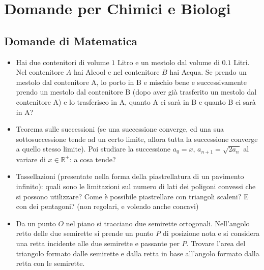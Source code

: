 \documentclass[a4paper,11pt]{article}
\newcommand{\RR}{\mathbb{R}}
\begin{document}
\begin{itemize}
\end{itemize}

\section*{Domande per Chimici e Biologi}
\subsection*{Domande di Matematica}
\begin{itemize}
\item Hai due contenitori di volume $1$ Litro e un mestolo dal volume di $0.1$ Litri. Nel contenitore $A$ hai Alcool e nel contenitore $B$ hai Acqua. Se prendo un mestolo dal contenitore A, lo porto in B e mischio bene e successivamente prendo un mestolo dal contenitore B (dopo aver gi\`a trasferito un mestolo dal contenitore A) e lo trasferisco in A, quanto A ci sar\`a in B e quanto B ci sar\`a in A?
\item Teorema sulle successioni (se una successione converge, ed una sua sottosuccessione tende ad un certo limite, allora tutta la successione converge a quello stesso limite). Poi studiare la successione $a_0 = x$, $a_{n+1} = \sqrt{2 a_n}$ al variare di $x \in \RR^+$: a cosa tende?
\item Tassellazioni (presentate nella forma della piastrellatura di un pavimento infinito): quali sono le limitazioni sul numero di lati dei poligoni convessi che si possono utilizzare? Come \`e possibile piastrellare con triangoli scaleni? E con dei pentagoni? (non regolari, e volendo anche concavi)
\item Da un punto $O$ nel piano si tracciano due semirette ortogonali. Nell'angolo retto delle due semirette si prende un punto $P$ di posizione nota e si considera una retta incidente alle due semirette e passante per $P$. Trovare l'area del triangolo formato dalle semirette e dalla retta in base all'angolo formato dalla retta con le semirette.
\end{itemize}
\end{document}
